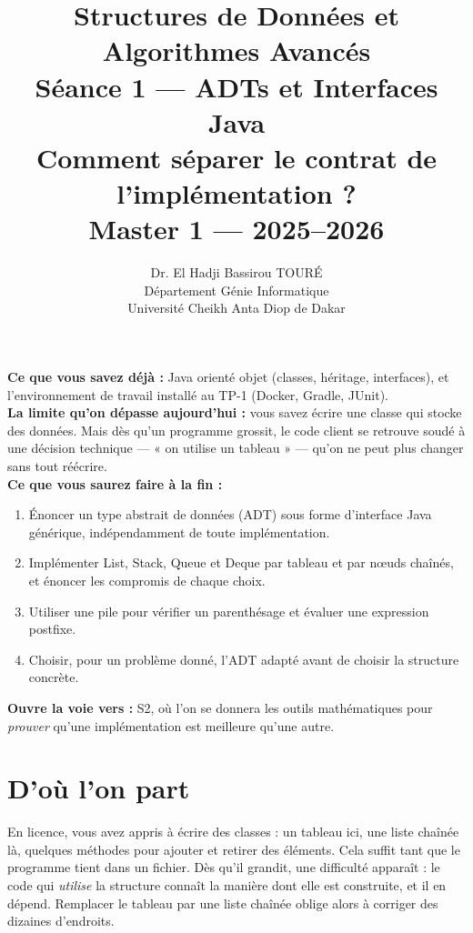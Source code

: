 \documentclass[11pt,a4paper]{article}
\title{%
\vspace{-1cm}
\textbf{\LARGE Structures de Données et}\\
\textbf{\LARGE Algorithmes Avancés}\\[0.8cm]
\textbf{\huge Séance 1 --- ADTs et Interfaces Java}\\[0.3cm]
\textbf{\Large Comment séparer le contrat de l'implémentation ?}\\[0.5cm]
\large Master 1 --- 2025--2026}
\author{Dr. El Hadji Bassirou TOURÉ\\
Département Génie Informatique\\
Université Cheikh Anta Diop de Dakar}
\date{}
\theoremstyle{definition}
\theoremstyle{remark}
\begin{document}
\maketitle
\thispagestyle{empty}

\begin{prereqbox}
\textbf{Ce que vous savez déjà :} Java orienté objet (classes, héritage,
interfaces), et l'environnement de travail installé au TP-1 (Docker, Gradle,
JUnit).\\[4pt]
\textbf{La limite qu'on dépasse aujourd'hui :} vous savez écrire une classe
qui stocke des données. Mais dès qu'un programme grossit, le code client se
retrouve soudé à une décision technique --- « on utilise un tableau » ---
qu'on ne peut plus changer sans tout réécrire.\\[4pt]
\textbf{Ce que vous saurez faire à la fin :}
\begin{enumerate}[nosep]
    \item Énoncer un type abstrait de données (ADT) sous forme d'interface
          Java générique, indépendamment de toute implémentation.
    \item Implémenter List, Stack, Queue et Deque par tableau et par nœuds
          chaînés, et énoncer les compromis de chaque choix.
    \item Utiliser une pile pour vérifier un parenthésage et évaluer une
          expression postfixe.
    \item Choisir, pour un problème donné, l'ADT adapté avant de choisir la
          structure concrète.
\end{enumerate}
\textbf{Ouvre la voie vers :} S2, où l'on se donnera les outils mathématiques
pour \emph{prouver} qu'une implémentation est meilleure qu'une autre.
\end{prereqbox}

\tableofcontents
\newpage

\section{D'où l'on part}

En licence, vous avez appris à écrire des classes : un tableau ici, une liste
chaînée là, quelques méthodes pour ajouter et retirer des éléments. Cela
suffit tant que le programme tient dans un fichier. Dès qu'il grandit, une
difficulté apparaît : le code qui \emph{utilise} la structure connaît la
manière dont elle est construite, et il en dépend. Remplacer le tableau par
une liste chaînée oblige alors à corriger des dizaines d'endroits.
\end{document}
